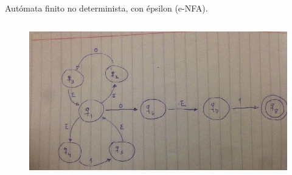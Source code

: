 \documentclass[addressstd,a4paper,10pt]{dinbrief}
\begin{document}
\begin{lstlisting}
\end{lstlisting}
\begin{lstlisting}
\end{lstlisting}
\begin{lstlisting}
\end{lstlisting}
\begin{lstlisting}
\end{lstlisting}
\begin{lstlisting}
\end{lstlisting}
\begin{lstlisting}
\end{lstlisting}
\begin{lstlisting}
\end{lstlisting}
\begin{lstlisting}
\end{lstlisting}
\begin{lstlisting}
\end{lstlisting}
\begin{lstlisting}
\end{lstlisting}
\begin{lstlisting}
\end{lstlisting}
\begin{lstlisting}
\end{lstlisting}
\begin{lstlisting}
\end{lstlisting}
\begin{lstlisting}
\end{lstlisting}
Aut\'omata finito no determinista, con \'epsilon (e-NFA).
\begin{lstlisting}
\end{lstlisting}

\begin{center}
\begin{figure}
\includegraphics[width=1\textwidth]{ENFA.png} 
\centering
\end{figure}
\end{center}
\end{document}
